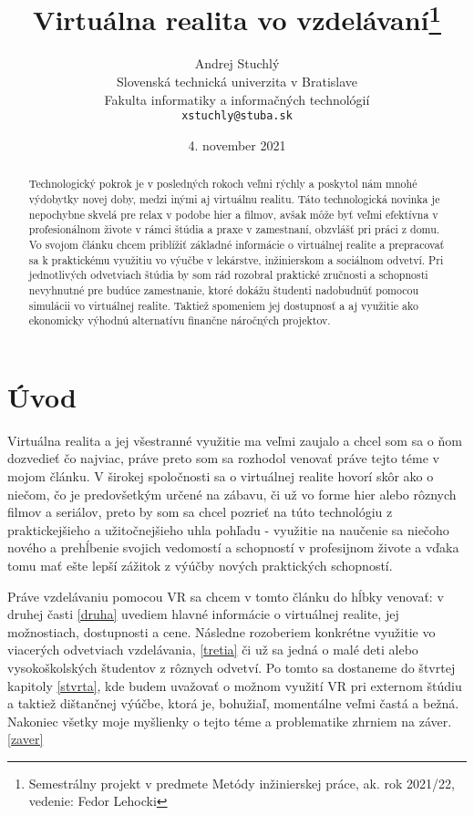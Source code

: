 \documentclass[10pt,twoside,slovak,a4paper]{article}
\title{Virtuálna realita vo vzdelávaní\thanks{Semestrálny projekt v predmete Metódy inžinierskej práce, ak. rok 2021/22, vedenie: Fedor Lehocki}}
\author{Andrej Stuchlý\\[2pt]
	{\small Slovenská technická univerzita v Bratislave}\\
	{\small Fakulta informatiky a informačných technológií}\\
	{\small \texttt{xstuchly@stuba.sk}}
	}
\date{\small 4. november 2021}
\begin{document}
\maketitle

\begin{abstract}
Technologický pokrok je v posledných rokoch veľmi rýchly a poskytol nám mnohé výdobytky novej doby, medzi inými aj virtuálnu realitu. Táto technologická novinka je nepochybne skvelá pre relax v podobe hier a filmov, avšak môže byť veľmi efektívna v profesionálnom živote v rámci štúdia a praxe v zamestnaní, obzvlášť pri práci z domu. Vo svojom článku chcem priblížiť základné informácie o virtuálnej realite a prepracovať sa k  praktickému využitiu vo výučbe v lekárstve, inžinierskom a sociálnom odvetví. Pri jednotlivých odvetviach štúdia by som rád rozobral praktické zručnosti a schopnosti nevyhnutné pre budúce zamestnanie, ktoré dokážu študenti nadobudnúť pomocou simulácii vo virtuálnej realite. Taktiež spomeniem jej dostupnosť a aj využitie ako ekonomicky výhodnú alternatívu finančne náročných projektov. 
\end{abstract}


\section{Úvod}
Virtuálna realita a jej všestranné využitie ma veľmi zaujalo a chcel som sa o ňom dozvedieť čo najviac, práve preto som sa rozhodol venovať práve tejto téme v mojom článku. V širokej spoločnosti sa o virtuálnej realite hovorí skôr ako o niečom, čo je predovšetkým určené na zábavu, či už vo forme hier alebo rôznych filmov a seriálov, preto by som sa chcel pozrieť na túto technológiu z praktickejšieho a užitočnejšieho uhla pohľadu - využitie na naučenie sa niečoho nového a prehĺbenie svojich vedomostí a schopností v profesijnom živote a vďaka tomu mať ešte lepší zážitok z výúčby nových praktických schopností.

Práve vzdelávaniu pomocou VR sa chcem v tomto článku do hĺbky venovať: v druhej časti \ref{druha} uvediem hlavné informácie o virtuálnej realite, jej možnostiach, dostupnosti a cene. Následne rozoberiem konkrétne využitie vo viacerých odvetviach vzdelávania, \ref{tretia} či už sa jedná o malé deti alebo vysokoškolských študentov z rôznych odvetví. Po tomto sa dostaneme do štvrtej kapitoly \ref{stvrta}, kde budem uvažovať o možnom využití VR pri externom štúdiu a taktiež dištančnej výúčbe, ktorá je, bohužiaľ, momentálne veľmi častá a bežná. Nakoniec všetky moje myšlienky o tejto téme a problematike zhrniem na záver. \ref{zaver}
\end{document}
